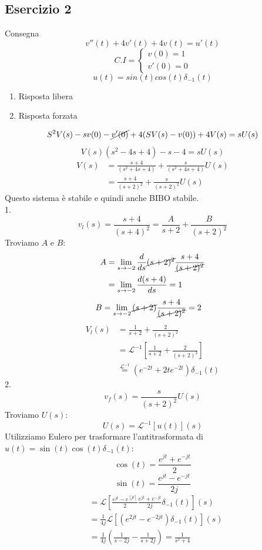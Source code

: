 \documentclass[a4paper]{article}
\begin{document}
\subsection{Esercizio 2}
\begin{examplebox}{Consegna}
    \[v''(t) + 4v'(t) + 4v(t) = u'(t)\]
    \[C.I = \begin{cases}
        v(0) = 1\\
        v'(0) = 0
    \end{cases}\]
    \[u(t) = sin(t)cos(t)\delta_{-1}(t)\]
    \begin{enumerate}
        \item Risposta libera
        \item Risposta forzata
    \end{enumerate}
\end{examplebox}
\[S^2V(s) - sv(0) - \cancel{v'(0)} + 4(SV(s) - v(0)) + 4V(s) = sU(s)\]
\[V(s)(s^2 - 4s + 4) - s - 4 = sU(s)\]
\begin{align*}
    V(s) &= \frac{s+4}{(s^2+4s+4)} + \frac{s}{(s^2+4s+4)}U(s)\\
    &= \frac{s+4}{(s+2)^2} + \frac{s}{(s+2)^2}U(s)
\end{align*}
Questo sistema è stabile e quindi anche BIBO stabile.\\
1. 
\[v_l(s) = \frac{s+4}{(s+4)^2} = \frac{A}{s+2} + \frac{B}{(s+2)^2}\]
Troviamo $A$ e $B$:
\begin{align*}
   A &= \lim_{s \rightarrow -2} \frac{d}{ds} \cancel{(s+2)^2}\frac{s+4}{\cancel{(s+2)^2}}\\ 
   &= \lim_{s \rightarrow -2} \frac{d(s+4)}{ds} = 1
\end{align*}
\begin{align*}
    B &= \lim_{s \rightarrow -2} \cancel{(s+2)}\frac{s+4}{\cancel{(s+2)^2}} = 2
\end{align*}
\begin{align*}
    V_l(s) &= \frac{1}{s+2} + \frac{2}{(s+2)^2}\\
    &= \mathcal{L}^{-1}\left[\frac{1}{s+2} + \frac{2}{(s+2)^2}\right]\\
    &\stackrel{\mathcal{L}^{-1}}{=} (e^{-2t} + 2te^{-2t})\delta_{-1}(t)
\end{align*}
2. 
\[v_f(s) = \frac{s}{(s+2)^2}U(s)\]
Troviamo $U(s)$: 
\[U(s) = \mathcal{L}^{-1}[u(t)](s)\]
Utilizziamo Eulero per trasformare l'antitrasformata di $u(t) = \sin(t)\cos(t)\delta_{-1}(t)$:
\[\cos(t) = \frac{e^{jt}+e^{-jt}}{2}\]
\[\sin(t) = \frac{e^{jt}-e^{-jt}}{2j}\]
\begin{align*}
    &= \mathcal{L}\left[\frac{e^{jt}-e^[jt]}{2}\frac{e^{jt}+e^{-jt}}{2j}\delta_{-1}(t)\right](s)\\
    &= \frac{1}{4j}\mathcal{L}[(e^{2jt} - e^{-2jt})\delta_{-1}(t)](s)\\
    &= \frac{1}{4j} \left(\frac{1}{s-2j} - \frac{1}{s+2j}\right) = \frac{1}{s^2 + 4}
\end{align*} 
\end{document}
